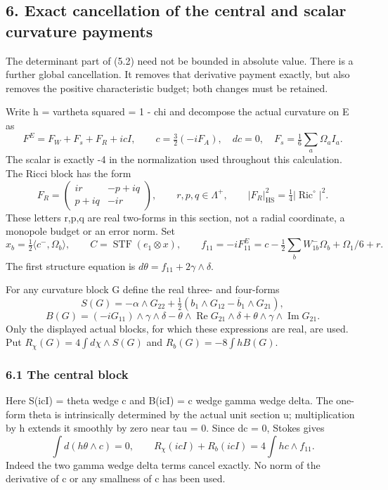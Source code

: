 \documentclass[
  10pt,
]{article}
\begin{document}
\hypertarget{exact-cancellation-of-the-central-and-scalar-curvature-payments}{%
\subsection{6. Exact cancellation of the central and scalar curvature
payments}\label{exact-cancellation-of-the-central-and-scalar-curvature-payments}}

The determinant part of (5.2) need not be bounded in absolute value.
There is a further global cancellation. It removes that derivative
payment exactly, but also removes the positive characteristic budget;
both changes must be retained.

Write h = vartheta squared = 1 - chi and decompose the actual curvature
on E as \[
 F^E=F_W+F_s+F_R+i c I,\qquad
 c=\tfrac32(-iF_A),\quad dc=0,\quad
 F_s=\tfrac16\sum_a\Omega_a I_a.
\] The scalar is exactly -4 in the normalization used throughout this
calculation. The Ricci block has the form \[
 F_R=\begin{pmatrix}ir&-p+iq\\p+iq&-ir\end{pmatrix},
 \qquad r,p,q\in\Lambda^+,
 \qquad |F_R|_{\mathrm{HS}}^2=\tfrac14|\operatorname{Ric}^{\circ}|^2.
\] These letters r,p,q are real two-forms in this section, not a radial
coordinate, a monopole budget or an error norm. Set \[
 x_b=\tfrac12\langle c^-,\Omega_b\rangle,\qquad
 C=\operatorname{STF}(e_1\otimes x),\qquad
 f_{11}=-iF^E_{11}
   =c-\tfrac12\sum_bW_{1b}^-\Omega_b+\Omega_1/6+r.
\] The first structure equation is
\(d\theta=f_{11}+2\gamma\wedge\delta\).

For any curvature block G define the real three- and four-forms \[
 S(G)=-\alpha\wedge G_{22}
       +\tfrac12(b_1\wedge G_{12}-\overline b_1\wedge G_{21}),
\] \[
 B(G)=(-iG_{11})\wedge\gamma\wedge\delta
       -\theta\wedge\operatorname{Re}G_{21}\wedge\delta
       +\theta\wedge\gamma\wedge\operatorname{Im}G_{21}.
\] Only the displayed actual blocks, for which these expressions are
real, are used. Put \(R_\chi(G)=4\int d\chi\wedge S(G)\) and
\(R_b(G)=-8\int hB(G)\).

\hypertarget{the-central-block}{%
\subsubsection{6.1 The central block}\label{the-central-block}}

Here S(icI) = theta wedge c and B(icI) = c wedge gamma wedge delta. The
one-form theta is intrinsically determined by the actual unit section u;
multiplication by h extends it smoothly by zero near tau = 0. Since dc =
0, Stokes gives \[
 \int d(h\theta\wedge c)=0,
 \qquad
 \boxed{R_\chi(icI)+R_b(icI)=4\int h c\wedge f_{11}.}     \tag{6.1}
\] Indeed the two gamma wedge delta terms cancel exactly. No norm of the
derivative of c or any smallness of c has been used.
\end{document}
